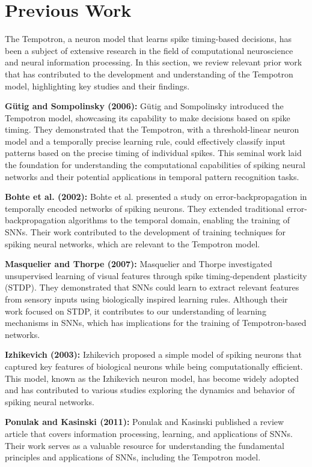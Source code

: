 \section*{Previous Work}

The Tempotron, a neuron model that learns spike timing-based decisions, has been a subject of extensive research in the field of computational neuroscience and neural information processing. In this section, we review relevant prior work that has contributed to the development and understanding of the Tempotron model, highlighting key studies and their findings.

\textbf{Gütig and Sompolinsky (2006):}
Gütig and Sompolinsky introduced the Tempotron model, showcasing its capability to make decisions based on spike timing. They demonstrated that the Tempotron, with a threshold-linear neuron model and a temporally precise learning rule, could effectively classify input patterns based on the precise timing of individual spikes. This seminal work laid the foundation for understanding the computational capabilities of spiking neural networks and their potential applications in temporal pattern recognition tasks.

\textbf{Bohte et al. (2002):}
Bohte et al. presented a study on error-backpropagation in temporally encoded networks of spiking neurons. They extended traditional error-backpropagation algorithms to the temporal domain, enabling the training of SNNs. Their work contributed to the development of training techniques for spiking neural networks, which are relevant to the Tempotron model.

\textbf{Masquelier and Thorpe (2007):}
Masquelier and Thorpe investigated unsupervised learning of visual features through spike timing-dependent plasticity (STDP). They demonstrated that SNNs could learn to extract relevant features from sensory inputs using biologically inspired learning rules. Although their work focused on STDP, it contributes to our understanding of learning mechanisms in SNNs, which has implications for the training of Tempotron-based networks.

\textbf{Izhikevich (2003):}
Izhikevich proposed a simple model of spiking neurons that captured key features of biological neurons while being computationally efficient. This model, known as the Izhikevich neuron model, has become widely adopted and has contributed to various studies exploring the dynamics and behavior of spiking neural networks.

\textbf{Ponulak and Kasinski (2011):}
Ponulak and Kasinski published a review article that covers information processing, learning, and applications of SNNs. Their work serves as a valuable resource for understanding the fundamental principles and applications of SNNs, including the Tempotron model.

